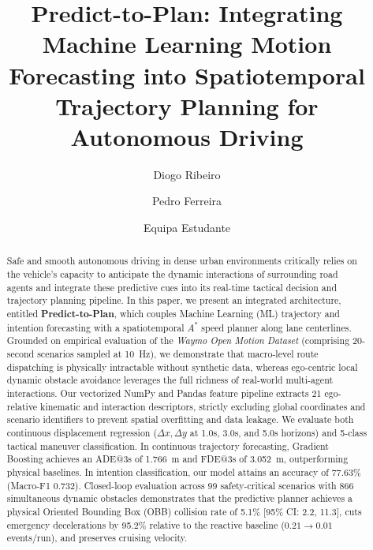 \documentclass[runningheads]{llncs}
\begin{document}
%
\title{Predict-to-Plan: Integrating Machine Learning Motion Forecasting into Spatiotemporal Trajectory Planning for Autonomous Driving}
%
%
\author{Diogo Ribeiro \and Pedro Ferreira \and Equipa Estudante}
%
%
%
\maketitle              %
%
\begin{abstract}
Safe and smooth autonomous driving in dense urban environments critically relies on the vehicle's capacity to anticipate the dynamic interactions of surrounding road agents and integrate these predictive cues into its real-time tactical decision and trajectory planning pipeline. In this paper, we present an integrated architecture, entitled \textbf{Predict-to-Plan}, which couples Machine Learning (ML) trajectory and intention forecasting with a spatiotemporal $A^*$ speed planner along lane centerlines. Grounded on empirical evaluation of the \textit{Waymo Open Motion Dataset} (comprising 20-second scenarios sampled at 10~Hz), we demonstrate that macro-level route dispatching is physically intractable without synthetic data, whereas ego-centric local dynamic obstacle avoidance leverages the full richness of real-world multi-agent interactions. 
Our vectorized NumPy and Pandas feature pipeline extracts 21 ego-relative kinematic and interaction descriptors, strictly excluding global coordinates and scenario identifiers to prevent spatial overfitting and data leakage. We evaluate both continuous displacement regression ($\Delta x, \Delta y$ at 1.0s, 3.0s, and 5.0s horizons) and 5-class tactical maneuver classification. In continuous trajectory forecasting, Gradient Boosting achieves an ADE@3s of 1.766~m and FDE@3s of 3.052~m, outperforming physical baselines. In intention classification, our model attains an accuracy of 77.63\% (Macro-F1 0.732). Closed-loop evaluation across 99 safety-critical scenarios with 866 simultaneous dynamic obstacles demonstrates that the predictive planner achieves a physical Oriented Bounding Box (OBB) collision rate of 5.1\% [95\% CI: 2.2, 11.3], cuts emergency decelerations by 95.2\% relative to the reactive baseline ($0.21 \to 0.01$ events/run), and preserves cruising velocity.

\end{abstract}
%
%
%
\end{document}
